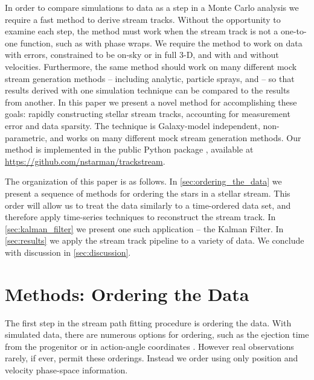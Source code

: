 \documentclass[fleqn,usenatbib]{mnras}
\begin{document}
  In order to compare simulations to data as a step in a Monte Carlo analysis we
  require a fast method to derive stream tracks. Without the opportunity to
  examine each step, the method must work when the stream track is not a
  one-to-one function, such as with phase wraps. We require the method to work
  on data with errors, constrained to be on-sky or in full 3-D, and with and
  without velocities. Furthermore, the same method should work on many different
  mock stream generation methods -- including analytic, particle sprays, and
  \nbodys{} -- so that results derived with one simulation technique
  can be compared to the results from another. In this paper we present a novel
  method for accomplishing these goals: rapidly constructing stellar stream
  tracks, accounting for measurement error and data sparsity. The technique is
  Galaxy-model independent, non-parametric, and works on many different mock
  stream generation methods. Our method is implemented in the public Python
  package \trackstream{}, available at
  \url{https://github.com/nstarman/trackstream}. 

  \vspace{5pt}

  The organization of this paper is as follows. In
  \autoref{sec:ordering_the_data} we present a sequence of methods for ordering
  the stars in a stellar stream. This order will allow us to treat the data
  similarly to a time-ordered data set, and therefore apply time-series
  techniques to reconstruct the stream track. In \autoref{sec:kalman_filter} we
  present one such application -- the Kalman Filter. In \autoref{sec:results} we
  apply the stream track pipeline to a variety of data. We conclude with
  discussion in \autoref{sec:discussion}.




\section{Methods: Ordering the Data} \label{sec:ordering_the_data}

  The first step in the stream path fitting procedure is ordering the data. With
  simulated data, there are numerous options for ordering, such as the ejection
  time from the progenitor \citep{Gibbons2014} or in action-angle coordinates
  \citep{Bovy2014}. However real observations rarely, if ever, permit these
  orderings. Instead we order using only position and velocity phase-space
  information.
\end{document}
